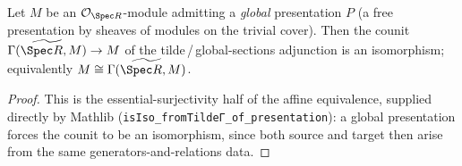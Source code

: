 \begin{lemma}
  \label{lem:tilde_counit_of_pres}
  Let $M$ be an $\mathcal{O}_{\Spec R}$-module admitting a \emph{global}
  presentation $P$ (a free presentation by sheaves of modules on the trivial
  cover). Then the counit $\widetilde{\Gamma(\Spec R, M)} \to M$ of the
  tilde\,/\,global-sections adjunction is an isomorphism; equivalently
  $M \cong \widetilde{\Gamma(\Spec R, M)}$.
  \begin{proof}
    This is the essential-surjectivity half of the affine equivalence, supplied
    directly by Mathlib (\texttt{isIso\_fromTildeΓ\_of\_presentation}): a global
    presentation forces the counit to be an isomorphism, since both source and
    target then arise from the same generators-and-relations data.
  \end{proof}
\end{lemma}

